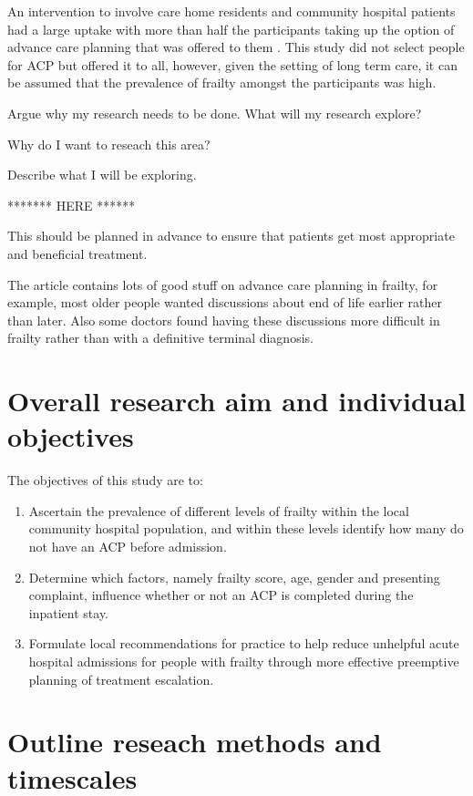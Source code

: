 \documentclass
[
	12pt,
	a4paper,
	oneside,
]{report}
\begin{document}
An intervention to involve care home residents and community hospital patients
had a large uptake with more than half the participants taking up the option of
advance care planning that was offered to them \textcite{mcglade:17}. This 
study did not select people for ACP but offered it to all, however, given the 
setting of long term care, it can be assumed that the prevalence of frailty
amongst the participants was high.

Argue why my research needs to be done.
What will my research explore? 

Why do I want to reseach this area?

Describe what I will be exploring.

******* HERE ******




This should be planned in advance to ensure that patients get most appropriate 
and beneficial treatment. 

The article \textcite{sharp:13} contains lots of good
stuff on advance care planning in frailty, for example, most older people wanted
discussions about end of life earlier rather than later. Also some doctors found
having these discussions  more difficult in frailty rather than with a 
definitive terminal diagnosis.

\section{Overall research aim and individual objectives}

The objectives of this study are to:
\begin{enumerate}
\item	Ascertain the prevalence of different levels of frailty within the local 
		community hospital population, and within these levels identify 
		how many do not have an ACP before admission.\label{obj:prevalence}
\item	Determine which factors, namely frailty score, age, gender and
		presenting complaint, influence whether or not an ACP is 
		completed during the inpatient stay.\label{obj:association}
\item	Formulate local recommendations for practice to help reduce unhelpful
		acute hospital admissions for people with frailty through more effective
		preemptive planning of treatment escalation.
\end{enumerate}


\section{Outline reseach methods and timescales}
\end{document}
